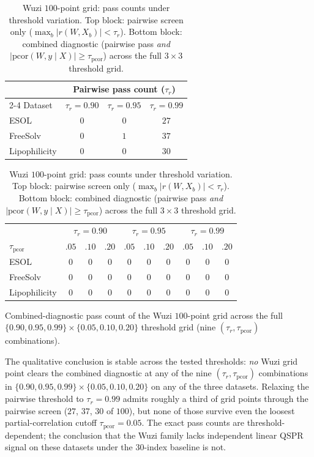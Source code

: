 \documentclass[STIX1COL]{WileyNJDv5}
\theoremstyle{definition}
\begin{document}
\begin{table}[!htbp]
\centering
\small
\caption{Wuzi $100$-point grid: pass counts under threshold variation. Top block: pairwise screen only ($\max_b\lvert r(W, X_b)\rvert < \tau_r$). Bottom block: combined diagnostic (pairwise pass \emph{and} $\lvert\mathrm{pcor}(W, y \mid X)\rvert \ge \tau_{\mathrm{pcor}}$) across the full $3 \times 3$ threshold grid.}
\label{tab:threshold_sensitivity}
\begin{tabular}{lccc}
\toprule
& \multicolumn{3}{c}{Pairwise pass count ($\tau_r$)}\\
\cmidrule(lr){2-4}
Dataset & $\tau_r = 0.90$ & $\tau_r = 0.95$ & $\tau_r = 0.99$\\
\midrule
ESOL          & $0$ & $0$ & $27$\\
FreeSolv      & $0$ & $1$ & $37$\\
Lipophilicity & $0$ & $0$ & $30$\\
\bottomrule
\end{tabular}

\vspace{0.6em}

\begin{tabular}{l|ccc|ccc|ccc}
\toprule
& \multicolumn{3}{c|}{$\tau_r = 0.90$} & \multicolumn{3}{c|}{$\tau_r = 0.95$} & \multicolumn{3}{c}{$\tau_r = 0.99$}\\
$\tau_{\mathrm{pcor}}$ & $.05$ & $.10$ & $.20$ & $.05$ & $.10$ & $.20$ & $.05$ & $.10$ & $.20$\\
\midrule
ESOL          & $0$ & $0$ & $0$ & $0$ & $0$ & $0$ & $0$ & $0$ & $0$\\
FreeSolv      & $0$ & $0$ & $0$ & $0$ & $0$ & $0$ & $0$ & $0$ & $0$\\
Lipophilicity & $0$ & $0$ & $0$ & $0$ & $0$ & $0$ & $0$ & $0$ & $0$\\
\bottomrule
\end{tabular}

\vspace{0.3em}
\noindent\small{Combined-diagnostic pass count of the Wuzi $100$-point grid across the full $\{0.90, 0.95, 0.99\} \times \{0.05, 0.10, 0.20\}$ threshold grid (nine $(\tau_r, \tau_{\mathrm{pcor}})$ combinations).}
\end{table}
\FloatBarrier

\noindent The qualitative conclusion is stable across the tested
thresholds: \emph{no} Wuzi grid point clears the combined
diagnostic at any of the nine $(\tau_r, \tau_{\mathrm{pcor}})$
combinations in $\{0.90, 0.95, 0.99\} \times \{0.05, 0.10, 0.20\}$
on any of the three datasets. Relaxing the pairwise threshold to
$\tau_r = 0.99$ admits roughly a third of grid points through the
pairwise screen ($27$, $37$, $30$ of $100$), but none of those
survive even the loosest partial-correlation cutoff
$\tau_{\mathrm{pcor}} = 0.05$. The exact pass counts are
threshold-dependent; the conclusion that the Wuzi family lacks
independent linear QSPR signal on these datasets under the
$30$-index baseline is not.
\end{document}
